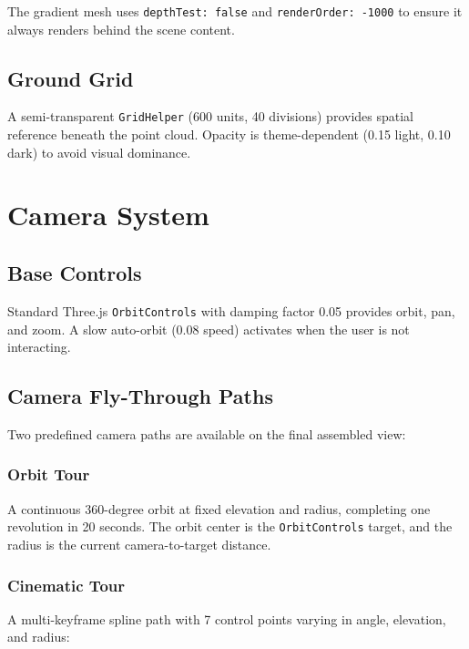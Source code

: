 \documentclass[11pt, letterpaper]{article}
\begin{document}
The gradient mesh uses \texttt{depthTest: false} and \texttt{renderOrder: -1000} to ensure it always renders behind the scene content.

\subsection{Ground Grid}

A semi-transparent \texttt{GridHelper} (600 units, 40 divisions) provides spatial reference beneath the point cloud. Opacity is theme-dependent (0.15 light, 0.10 dark) to avoid visual dominance.

\section{Camera System}

\subsection{Base Controls}

Standard Three.js \texttt{OrbitControls} with damping factor 0.05 provides orbit, pan, and zoom. A slow auto-orbit (0.08 speed) activates when the user is not interacting.

\subsection{Camera Fly-Through Paths}

Two predefined camera paths are available on the final assembled view:

\subsubsection{Orbit Tour}
A continuous 360-degree orbit at fixed elevation and radius, completing one revolution in 20 seconds. The orbit center is the \texttt{OrbitControls} target, and the radius is the current camera-to-target distance.

\subsubsection{Cinematic Tour}
A multi-keyframe spline path with 7 control points varying in angle, elevation, and radius:
\end{document}
